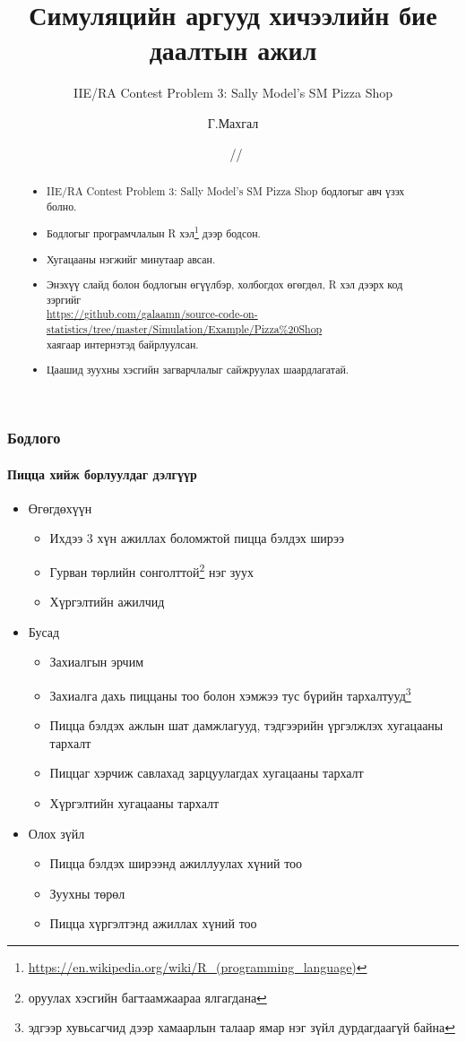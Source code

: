 \documentclass{beamer}
\title[Симуляцийн аргууд]{Симуляцийн аргууд хичээлийн бие даалтын ажил}
\subtitle{IIE/RA Contest Problem 3: Sally Model's SM Pizza Shop}
\author{Г.Махгал}
\institute[]{МУИС -- ХШУИС -- Хэрэглээний Математикийн Тэнхим}
\date[Бие даалтын ажил]{\tiny \faCodeFork\ \the\year/\the\month/\the\day}
\begin{document}
\frame{\titlepage}

\frame
{\frametitle{}\framesubtitle{}
\begin{abstract}
\begin{itemize}
\item IIE/RA Contest Problem 3: Sally Model's SM Pizza Shop бодлогыг авч үзэх болно.
\item Бодлогыг програмчлалын R хэл\footnote{\url{https://en.wikipedia.org/wiki/R_(programming_language)}} дээр бодсон.
\item Хугацааны нэгжийг минутаар авсан.
\item Энэхүү слайд болон бодлогын өгүүлбэр, холбогдох өгөгдөл, R хэл дээрх код зэргийг
\\ {\color{blue}\url{https://github.com/galaamn/source-code-on-statistics/tree/master/Simulation/Example/Pizza\%20Shop}}
\\
хаягаар интернэтэд байрлуулсан.
\item Цаашид зуухны хэсгийн загварчлалыг сайжруулах шаардлагатай.
\end{itemize}
\end{abstract}
}

\frame
{\frametitle{Бодлого}\framesubtitle{Пицца хийж борлуулдаг дэлгүүр}
\begin{itemize}
\item Өгөгдөхүүн
\begin{itemize}
\item Ихдээ 3 хүн ажиллах боломжтой пицца бэлдэх ширээ
\item Гурван төрлийн сонголттой\footnote{оруулах хэсгийн багтаамжаараа ялгагдана} нэг зуух
\item Хүргэлтийн ажилчид
\end{itemize}
\item Бусад
\begin{itemize}
\item Захиалгын эрчим
\item Захиалга дахь пиццаны тоо болон хэмжээ тус бүрийн тархалтууд\footnote{эдгээр хувьсагчид дээр хамаарлын талаар ямар нэг зүйл дурдагдаагүй байна}
\item Пицца бэлдэх ажлын шат дамжлагууд, тэдгээрийн үргэлжлэх хугацааны тархалт
\item Пиццаг хэрчиж савлахад зарцуулагдах хугацааны тархалт
\item Хүргэлтийн хугацааны тархалт
\end{itemize}
\item Олох зүйл
\begin{itemize}
\item Пицца бэлдэх ширээнд ажиллуулах хүний тоо
\item Зуухны төрөл
\item Пицца хүргэлтэнд ажиллах хүний тоо
\end{itemize}
\end{itemize}
}
\end{document}
